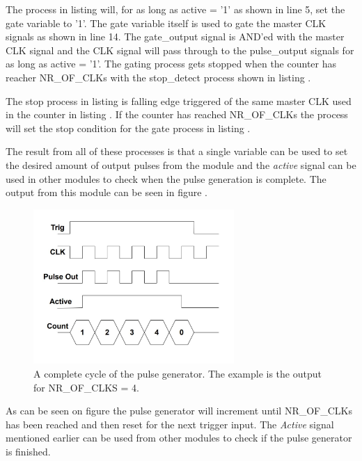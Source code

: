 

The process in listing  will, for as long as active = '1' as shown in line 5, set the gate variable to '1'. The gate variable itself is used to gate the master CLK signals as shown in line 14. The gate\_output signal is AND'ed with the master CLK signal and the CLK signal will pass through to the pulse\_output signals for as long as active = '1'. The gating process gets stopped when the counter has reacher NR\_OF\_CLKs with the stop\_detect process shown in listing .



The stop process in listing  is falling edge triggered of the same master CLK used in the counter in listing . If the counter has reached NR\_OF\_CLKs the process will set the stop condition for the gate process in listing .

The result from all of these processes is that a single variable can be used to set the desired amount of output pulses from the module and the \textit{active} signal can be used in other modules to check when the pulse generation is complete. The output from this module can be seen in figure .

\begin{figure}[H]
    \centering
    \includegraphics[clip, trim=0 50 0 0, width=0.68\textwidth]{Sections/7_SystemDesign/Figures/7_2_7_PulseGenOutput.pdf}
    \caption{A complete cycle of the pulse generator. The example is the output for NR\_OF\_CLKS = 4.}
    \label{fig:7_2_7_PulseGenOutput}
\end{figure}

As can be seen on figure  the pulse generator will increment until NR\_OF\_CLKs has been reached and then reset for the next trigger input. The \textit{Active} signal mentioned earlier can be used from other modules to check if the pulse generator is finished.